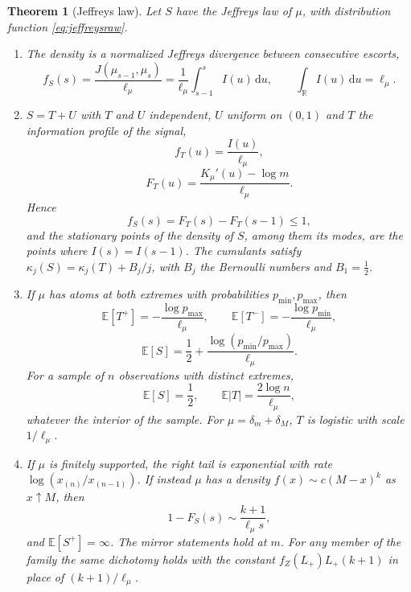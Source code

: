 \documentclass[sn-mathphys-num]{sn-jnl}\newcommand{\SNJNL}{}
\theoremstyle{thmstyleone}
\newtheorem{theorem}{Theorem}
\theoremstyle{thmstyletwo}
\theoremstyle{thmstylethree}
\theoremstyle{thmstyleone}
\providecommand{\R}{\mathbb{R}}
\providecommand{\E}{\mathbb{E}}
\providecommand{\dd}{\,\mathrm{d}}
\begin{document}
	\begin{theorem}[Jeffreys law]
		\label{thm:jeffreys}
		Let $S$ have the Jeffreys law of $\mu$, with distribution
		function \eqref{eq:jeffreysraw}.
		\begin{enumerate}[label=\textup{(\roman*)},leftmargin=2.2em]
			\item The density is a normalized Jeffreys divergence between
			consecutive escorts,
			\begin{equation}\label{eq:jeffreysdensity}
				f_S(s)=\frac{J(\mu_{s-1},\mu_s)}{\ell_\mu}
				=\frac1{\ell_\mu}\int_{s-1}^{s}I(u)\dd u,
				\qquad
				\int_\R I(u)\dd u=\ell_\mu .
			\end{equation}
			\item $S=T+U$ with $T$ and $U$ independent, $U$ uniform on $(0,1)$
			and $T$ the \emph{information profile} of the signal,
			\begin{equation}\label{eq:Tlaw}
				f_T(u)=\frac{I(u)}{\ell_\mu},
			\end{equation}
			\begin{equation}\label{eq:Tlaw2}
				F_T(u)=\frac{K_\mu'(u)-\log m}{\ell_\mu} .
			\end{equation}
			Hence
			\begin{equation}\label{eq:unitincrement}
				f_S(s)=F_T(s)-F_T(s-1)\le1,
			\end{equation}
			and the stationary points of the density of $S$, among them its
			modes, are the points where $I(s)=I(s-1)$. The
			cumulants satisfy $\kappa_j(S)=\kappa_j(T)+B_j/j$, with $B_j$ the
			Bernoulli numbers and $B_1=\tfrac12$.
			\item If $\mu$ has atoms at both extremes with probabilities
			$p_{\min},p_{\max}$, then
			\begin{equation}\label{eq:surprisal}
				\E[T^{+}]=-\frac{\log p_{\max}}{\ell_\mu},
				\qquad
				\E[T^{-}]=-\frac{\log p_{\min}}{\ell_\mu},
			\end{equation}
			\begin{equation}\label{eq:surprisal2}
				\E[S]=\frac12+\frac{\log(p_{\min}/p_{\max})}{\ell_\mu} .
			\end{equation}
			For a sample of $n$ observations with distinct extremes,
			\begin{equation}\label{eq:samplemean}
				\E[S]=\frac12,
				\qquad
				\E|T|=\frac{2\log n}{\ell_\mu},
			\end{equation}
			whatever the interior of the sample. For $\mu=\delta_m+\delta_M$, $T$
			is logistic with scale $1/\ell_\mu$.
			
			\item If $\mu$ is finitely supported, the right tail is exponential
			with rate $\log(x_{(n)}/x_{(n-1)})$. If
			instead $\mu$ has a density $f(x)\sim c(M-x)^{k}$ as $x\uparrow M$,
			then
			\begin{equation}\label{eq:cauchytail}
				1-F_S(s)\sim\frac{k+1}{\ell_\mu s},
			\end{equation}
			and $\E[S^{+}]=\infty$. The mirror statements hold at $m$. For
			any member of the family the same dichotomy holds with the
			constant $f_Z(L_+)L_+(k+1)$ in place of $(k+1)/\ell_\mu$.
		\end{enumerate}
	\end{theorem}
	
\end{document}

